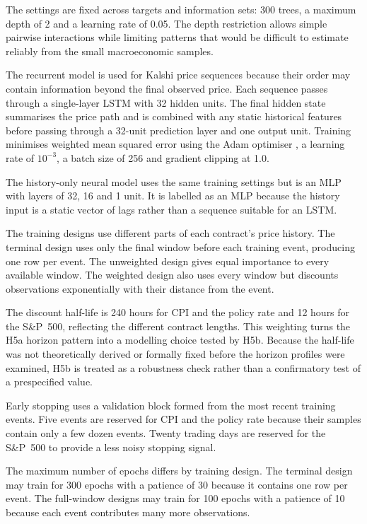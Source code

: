 \documentclass[12pt,a4paper]{report}
\begin{document}
The settings are fixed across targets and information sets: 300 trees, a
maximum depth of 2 and a learning rate of 0.05. The depth restriction allows
simple pairwise interactions while limiting patterns that would be difficult to
estimate reliably from the small macroeconomic samples.

The recurrent model is used for Kalshi price sequences because their order may
contain information beyond the final observed price. Each sequence passes
through a single-layer LSTM \parencite{hochreiter1997} with 32 hidden units.
The final hidden state summarises the price path and is combined with any static
historical features before passing through a 32-unit prediction layer and one
output unit. Training minimises weighted mean squared error using the Adam
optimiser \parencite{kingma2015}, a learning rate of \(10^{-3}\), a batch size
of 256 and gradient clipping at 1.0.

The history-only neural model uses the same training settings but is an MLP
with layers of 32, 16 and 1 unit. It is labelled as an MLP because the history
input is a static vector of lags rather than a sequence suitable for an LSTM.

The training designs use different parts of each contract's price history. The
terminal design uses only the final window before each training event,
producing one row per event. The unweighted design gives equal importance to
every available window. The weighted design also uses every window but
discounts observations exponentially with their distance from the event.

The discount half-life is 240 hours for CPI and the policy rate and 12 hours
for the S\&P~500, reflecting the different contract lengths. This weighting
turns the H5a horizon pattern into a modelling choice tested by H5b. Because the
half-life was not theoretically derived or formally fixed before the horizon
profiles were examined, H5b is treated as a robustness check rather than a
confirmatory test of a prespecified value.

Early stopping uses a validation block formed from the most recent training
events. Five events are reserved for CPI and the policy rate because their
samples contain only a few dozen events. Twenty trading days are reserved for
the S\&P~500 to provide a less noisy stopping signal.

The maximum number of epochs differs by training design. The terminal design
may train for 300 epochs with a patience of 30 because it contains one row per
event. The full-window designs may train for 100 epochs with a patience of 10
because each event contributes many more observations.
\end{document}
